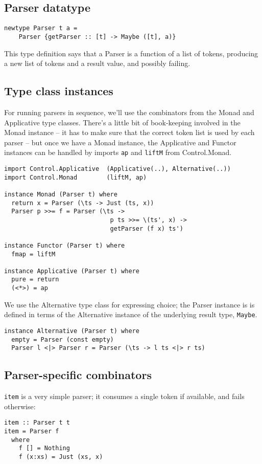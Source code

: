 \documentclass{tmr}
\begin{document}
\subsection{Parser datatype}
\begin{verbatim}
newtype Parser t a = 
    Parser {getParser :: [t] -> Maybe ([t], a)}
\end{verbatim}
This type definition says that a Parser is a function
of a list of tokens, producing a new list of tokens and a result
value, and possibly failing.

\subsection{Type class instances}
For running parsers in sequence, we'll use the combinators from the Monad and
Applicative type classes.  There's a little bit of book-keeping involved in the
Monad instance -- it has to make sure that the correct token list is used by
each parser -- but once we have a Monad instance, the Applicative and Functor
instances can be handled by imports \verb+ap+ and \verb+liftM+ from Control.Monad.
\begin{verbatim}
import Control.Applicative  (Applicative(..), Alternative(..))
import Control.Monad        (liftM, ap)

instance Monad (Parser t) where
  return x = Parser (\ts -> Just (ts, x))
  Parser p >>= f = Parser (\ts ->
                             p ts >>= \(ts', x) ->
                             getParser (f x) ts')

instance Functor (Parser t) where
  fmap = liftM
  
instance Applicative (Parser t) where
  pure = return
  (<*>) = ap 
\end{verbatim}

We use the Alternative type class for expressing choice; the Parser instance is  
is defined in terms of the Alternative instance of the
underlying result type, \verb+Maybe+.
\begin{verbatim}
instance Alternative (Parser t) where
  empty = Parser (const empty)
  Parser l <|> Parser r = Parser (\ts -> l ts <|> r ts)
\end{verbatim}

\subsection{Parser-specific combinators}
\verb+item+ is a very simple parser; it 
consumes a single token if available, and fails otherwise:
\begin{verbatim}
item :: Parser t t
item = Parser f
  where 
    f [] = Nothing
    f (x:xs) = Just (xs, x)
\end{verbatim}
\end{document}
